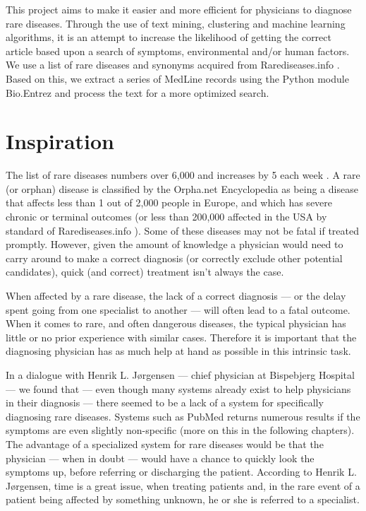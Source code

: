 This project aims to make it easier and more efficient for physicians
to diagnose rare diseases. Through the use of text mining,
clustering and machine learning algorithms, it is an attempt to
increase the likelihood of getting the correct article based upon a
search of symptoms, environmental and/or human factors. We use a list
of rare diseases and synonyms acquired from Rarediseases.info
\cite{Rarediseases}. Based on this, we
extract a series of MedLine records \cite{PubMedFactSheetMedline}
using the Python module Bio.Entrez \cite{EntrezProgUtil} and process
the text for a more optimized search.

\section{Inspiration}

The list of rare diseases numbers over 6,000 and increases by 5 each
week \cite{AboutRareDiseasesOrphanet}. A rare (or orphan) disease is
classified by the Orpha.net Encyclopedia \cite{OrphanetEncyclopedia}
as being a disease that affects less than 1 out of 2,000 people in
Europe, and which has severe chronic or terminal outcomes (or less
than 200,000 affected in the USA by standard of Rarediseases.info
\cite{Rarediseases}). Some of these  diseases may not be fatal if treated promptly. However,
given the amount of knowledge a physician would need to carry
around to make a correct diagnosis (or correctly exclude other
potential candidates), quick (and correct) treatment isn't always the case.

When affected by a rare disease, the lack of a correct diagnosis
--- or the delay spent going from one specialist to another --- will
often lead to a fatal outcome. When it comes to rare, and often
dangerous diseases, the typical physician has little or no prior
experience with similar cases. Therefore it is important that the
diagnosing physician has as much help at hand as possible in this
intrinsic task.

In a dialogue with Henrik L. J\o rgensen \cite{TheDude} --- chief
physician at Bispebjerg Hospital --- we found that --- even though
many systems already exist to help physicians in their diagnosis ---
there seemed to be a lack of a system for specifically diagnosing rare
diseases. Systems such as PubMed returns numerous results if the
symptoms are even slightly non-specific (more on this in the following
chapters). The advantage of a specialized system for rare diseases
would be that the physician --- when in doubt --- would have a chance
to quickly look the symptoms up, before referring or discharging the
patient. According to Henrik L. J\o rgensen, time is a great issue,
when treating patients and, in the rare event of a patient being
affected by something unknown, he or she is referred to a specialist.

